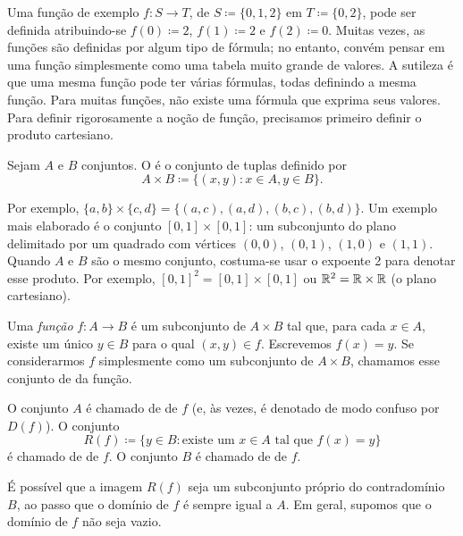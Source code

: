 Uma fun\c{c}\~ao de exemplo
$f \colon S \to T$, de $S \coloneqq \{ 0, 1, 2 \}$ em $T \coloneqq \{ 0, 2 \}$,
pode ser definida atribuindo-se $f(0) \coloneqq 2$, $f(1) \coloneqq 2$ e
$f(2) \coloneqq 0$.
%
Muitas vezes, as fun\c{c}\~oes s\~ao definidas por algum tipo de
f\'ormula; no entanto, conv\'em pensar em uma fun\c{c}\~ao simplesmente como
uma tabela muito grande de valores.
A sutileza é que uma mesma fun\c{c}\~ao pode ter v\'arias f\'ormulas,
todas definindo a mesma fun\c{c}\~ao.
Para muitas fun\c{c}\~oes, n\~ao existe uma f\'ormula que exprima seus valores.
Para definir rigorosamente a no\c{c}\~ao de fun\c{c}\~ao, precisamos primeiro
definir o produto cartesiano.

\begin{defn}
Sejam $A$ e $B$ conjuntos. O \emph{}
é o conjunto de tuplas definido por
\begin{equation*}
A \times B \coloneqq
\bigl\{ (x,y) : x \in A, y \in B \bigr\} .
\end{equation*}
\end{defn}

Por exemplo, $\{ a,b \} \times \{ c , d\} =
\bigl\{
(a,c), (a,d), (b,c), (b,d)
\bigr\}$.
Um exemplo mais elaborado é o conjunto $[0,1] \times [0,1]$: um
subconjunto do plano delimitado por um quadrado com v\'ertices $(0,0)$,
$(0,1)$, $(1,0)$ e $(1,1)$.
Quando $A$ e $B$ s\~ao o mesmo conjunto, costuma-se usar o expoente 2 para
denotar esse produto. Por exemplo, $[0,1]^2 =
[0,1] \times [0,1]$ ou ${\mathbb{R}}^2 = {\mathbb{R}} \times {\mathbb{R}}$ (o plano cartesiano).

\begin{defn}
Uma \emph{fun\c{c}\~ao} $f \colon A \to B$ é um subconjunto de $A \times B$
tal que, para cada $x \in A$, existe um \'unico $y \in B$ para o qual
$(x,y) \in f$.
Escrevemos $f(x) = y$.
Se considerarmos $f$ simplesmente como um subconjunto de $A \times B$,
chamamos esse conjunto de
\emph{} da fun\c{c}\~ao.

O conjunto $A$ é chamado de \emph{} de $f$ (e,
às vezes, é denotado de modo confuso por $D(f)$). O conjunto
\begin{equation*}
R(f) \coloneqq \{ y \in B : \text{existe um } x \in A \text{ tal que }
f(x)=y \}
\end{equation*}
é chamado de \emph{} de $f$.
O conjunto $B$ é chamado de \emph{} de $f$.
\end{defn}

É poss\'ivel que a imagem $R(f)$ seja um subconjunto pr\'oprio do
contradom\'inio $B$, ao passo que o dom\'inio de $f$ é sempre igual a $A$.
Em geral, supomos que o dom\'inio de $f$ n\~ao seja vazio.

